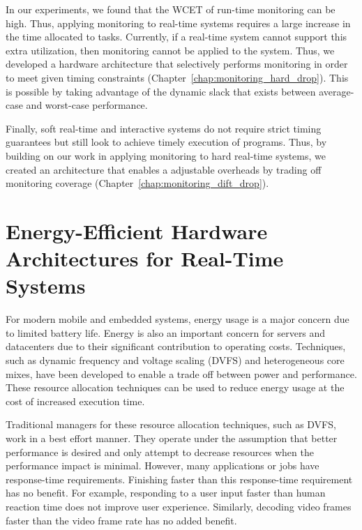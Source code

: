 In our experiments, we found that the WCET of run-time monitoring can be high.
Thus, applying monitoring to real-time systems requires a large increase in the
time allocated to tasks. Currently, if a real-time system cannot support this
extra utilization, then monitoring cannot be applied to the system.  Thus, we
developed a hardware architecture that selectively performs monitoring in order
to meet given timing constraints (Chapter~\ref{chap:monitoring_hard_drop}).
This is possible by taking advantage of the dynamic slack that exists between
average-case and worst-case performance.

Finally, soft real-time and interactive systems do not require strict timing guarantees
but still look to achieve timely execution of programs. Thus, by building on
our work in applying monitoring to hard real-time systems, we created an
architecture that enables a adjustable overheads by trading off monitoring coverage
(Chapter~\ref{chap:monitoring_dift_drop}). 

\section{Energy-Efficient Hardware Architectures for Real-Time Systems}
\label{sec:intro.energy}

For modern mobile and embedded systems, energy usage is a major concern due to
limited battery life. Energy is also an important concern for servers and
datacenters due to their significant contribution to operating costs.
Techniques, such as dynamic frequency and voltage scaling (DVFS) and
heterogeneous core mixes, have been developed to enable a trade off between
power and performance. These resource allocation techniques can be used to
reduce energy usage at the cost of increased execution time.

Traditional managers for these resource allocation techniques, such as DVFS,
work in a best effort manner. They operate under the assumption that better
performance is desired and only attempt to decrease resources when the
performance impact is minimal.  However, many applications or jobs have
response-time requirements.  Finishing faster than this response-time
requirement has no benefit. For example, responding to a user input faster than
human reaction time does not improve user experience. Similarly, decoding video
frames faster than the video frame rate has no added benefit. 

